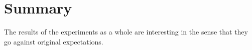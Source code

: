 	\section{Summary}
	\label{exp:summary}

		The results of the experiments as a whole are interesting in the sense that they go against original expectations.


